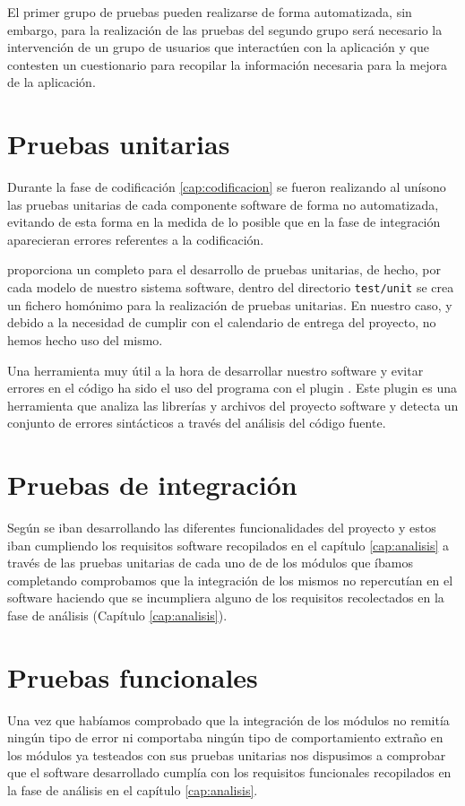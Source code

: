 El primer grupo de pruebas pueden realizarse de forma automatizada, sin embargo,
para la realización de las pruebas del segundo grupo será necesario la
intervención de un grupo de usuarios que interactúen con la aplicación y que
contesten un cuestionario para recopilar la información necesaria para la mejora
de la aplicación.

\section{Pruebas unitarias}
Durante la fase de codificación \ref{cap:codificacion} se fueron realizando al
unísono las pruebas unitarias de cada componente software de forma no
automatizada, evitando de esta forma en la medida de lo posible que en la fase
de integración aparecieran errores referentes a la codificación.

 proporciona un completo  para el
desarrollo de pruebas unitarias, de hecho, por cada modelo de nuestro sistema
software, dentro del directorio \texttt{test/unit} se crea un fichero homónimo
para la realización de pruebas unitarias. En nuestro caso, y debido a la
necesidad de cumplir con el calendario de entrega del proyecto, no hemos hecho
uso del mismo.

Una herramienta muy útil a la hora de desarrollar nuestro software y evitar
errores en el código ha sido el uso del programa  con el
plugin . Este plugin es una herramienta que analiza las
librerías y archivos del proyecto software y detecta un conjunto de errores
sintácticos a través del análisis del código fuente.

\section{Pruebas de integración}
Según se iban desarrollando las diferentes funcionalidades del proyecto y estos
iban cumpliendo los requisitos software recopilados en el capítulo
\ref{cap:analisis} a través de las pruebas unitarias de cada uno de de los
módulos que íbamos completando comprobamos que la integración de los mismos no
repercutían en el software haciendo que se incumpliera alguno de los requisitos
recolectados en la fase de análisis (Capítulo \ref{cap:analisis}).


\section{Pruebas funcionales}
Una vez que habíamos comprobado que la integración de los módulos no remitía
ningún tipo de error ni comportaba ningún tipo de comportamiento extraño en los
módulos ya testeados con sus pruebas unitarias nos dispusimos a comprobar que el
software desarrollado cumplía con los requisitos funcionales recopilados en la
fase de análisis en el capítulo \ref{cap:analisis}.

